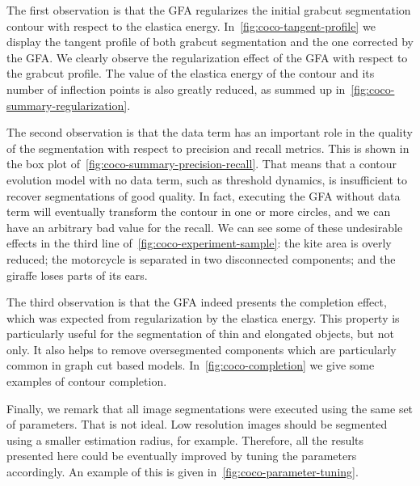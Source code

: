 \documentclass[review]{siamart220329}
\begin{document}
%
%
The first observation is that the GFA regularizes the initial grabcut
segmentation contour with respect to the elastica energy.
In~\cref{fig:coco-tangent-profile} we display the tangent profile of both
grabcut segmentation and the one corrected by the GFA. We clearly observe the
regularization effect of the GFA with respect to the grabcut profile. The value
of the elastica energy of the contour and its number of inflection points is
also greatly reduced, as summed up in~\cref{fig:coco-summary-regularization}.

The second observation is that the data term has an important role in the
quality of the segmentation with respect to precision and recall metrics. This
is shown in the box plot of~\cref{fig:coco-summary-precision-recall}. That means
that a contour evolution model with no data term, such as threshold dynamics, is
insufficient to recover segmentations of good quality. In fact, executing the
GFA without data term will eventually transform the contour in one or more
circles, and we can have an arbitrary bad value for the recall. We can see some
of these undesirable effects in the third line
of~\cref{fig:coco-experiment-sample}: the kite area is overly reduced; the
motorcycle is separated in two disconnected components; and the giraffe loses
parts of its ears.

The third observation is that the GFA indeed presents the completion effect,
which was expected from regularization by the elastica energy. This property is
particularly useful for the segmentation of thin and elongated objects, but not
only. It also helps to remove oversegmented components which are particularly
common in graph cut based models. In~\cref{fig:coco-completion} we give some
examples of contour completion.

Finally, we remark that all image segmentations were executed using the same set
of parameters. That is not ideal. Low resolution images should be segmented
using a smaller estimation radius, for example. Therefore, all the results
presented here could be eventually improved by tuning the parameters
accordingly. An example of this is given in~\cref{fig:coco-parameter-tuning}.
\end{document}

